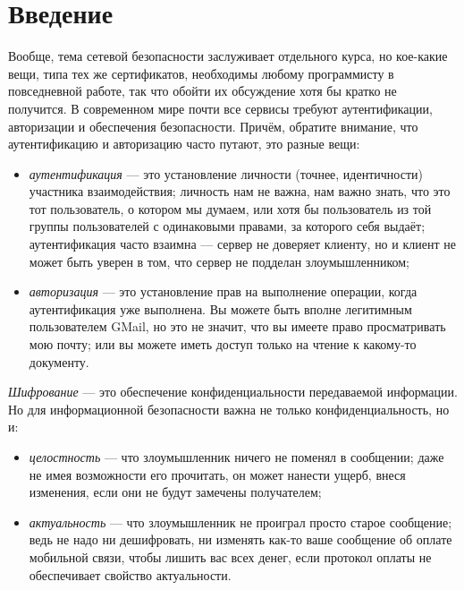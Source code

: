 \documentclass{../../text-style}
\begin{document}
\maketitle
\thispagestyle{empty}

\section{Введение}

Вообще, тема сетевой безопасности заслуживает отдельного курса, но кое-какие вещи, типа тех же сертификатов, необходимы любому программисту в повседневной работе, так что обойти их обсуждение хотя бы кратко не получится. В современном мире почти все сервисы требуют аутентификации, авторизации и обеспечения безопасности. Причём, обратите внимание, что аутентификацию и авторизацию часто путают, это разные вещи:

\begin{itemize}
    \item \textit{аутентификация} --- это установление личности (точнее, идентичности) участника взаимодействия; личность нам не важна, нам важно знать, что это тот пользователь, о котором мы думаем, или хотя бы пользователь из той группы пользователей с одинаковыми правами, за которого себя выдаёт; аутентификация часто взаимна --- сервер не доверяет клиенту, но и клиент не может быть уверен в том, что сервер не подделан злоумышленником;
    \item \textit{авторизация} --- это установление прав на выполнение операции, когда аутентификация уже выполнена. Вы можете быть вполне легитимным пользователем GMail, но это не значит, что вы имеете право просматривать мою почту; или вы можете иметь доступ только на чтение к какому-то документу.
\end{itemize}

\textit{Шифрование} --- это обеспечение конфиденциальности передаваемой информации. Но для информационной безопасности важна не только конфиденциальность, но и:

\begin{itemize}
    \item \textit{целостность} --- что злоумышленник ничего не поменял в сообщении; даже не имея возможности его прочитать, он может нанести ущерб, внеся изменения, если они не будут замечены получателем;
    \item \textit{актуальность} --- что злоумышленник не проиграл просто старое сообщение; ведь не надо ни дешифровать, ни изменять как-то ваше сообщение об оплате мобильной связи, чтобы лишить вас всех денег, если протокол оплаты не обеспечивает свойство актуальности.
\end{itemize}
\end{document}
